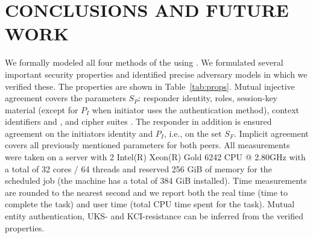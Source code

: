 \documentclass[runningheads]{llncs}
\begin{document}
\section{\uppercase{Conclusions and Future Work}}
\label{sec:conclusion}
We formally modeled all four
methods of the \mEdhoc{} \mSpec{} using \mTamarin.
%
We formulated several important security properties and identified precise
adversary models in which we verified these.
%
The properties are shown in Table~\ref{tab:props}.
%
Mutual injective agreement covers the parameters $S_P$:
responder identity, roles, session-key material (except for $P_I$ when
initiator uses the \mStat{} authentication
method), context identifiers \mCi{} and \mCr, and cipher suites \mSuites.
%
The responder in addition is ensured agreement on the initiators identity and
$P_I$, i.e., on the set $S_F$.
%
Implicit agreement covers all previously mentioned parameters for both 
peers.
%
All measurements were taken on a server with 2 Intel(R) Xeon(R) Gold
6242 CPU @ 2.80GHz with a total of 32 cores / 64 threads and reserved
256 GiB of memory for the scheduled job (the machine has a total of
384 GiB installed).
%
Time measurements are rounded to the nearest second and we report both
the real time (time to complete the task) and user time (total CPU time
spent for the task).
%
Mutual entity authentication, UKS- and KCI-resistance can be inferred
from the verified properties.
%
\end{document}
